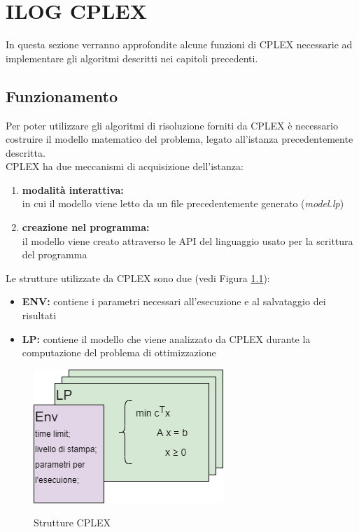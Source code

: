 \chapter{ILOG CPLEX}
In questa sezione verranno approfondite alcune funzioni di CPLEX necessarie ad implementare gli algoritmi descritti nei capitoli precedenti.

\section{Funzionamento}
Per poter utilizzare gli algoritmi di risoluzione forniti da CPLEX è necessario costruire il modello matematico del problema, legato all'istanza precedentemente descritta.\\
CPLEX ha due meccanismi di acquisizione dell'istanza:
\begin{enumerate}
\item{\textbf{modalità interattiva:}\\
in cui il modello viene letto da un file precedentemente generato (\textit{model.lp})}
\item{\textbf{creazione nel programma:}\\
il modello viene creato attraverso le API del linguaggio usato per la scrittura del programma}
\end{enumerate}

Le strutture utilizzate da CPLEX sono due (vedi Figura \ref{strutture_cplex}):
\begin{itemize}
\item{\textbf{ENV:} contiene i parametri necessari all'esecuzione e al salvataggio dei risultati}
\item{\textbf{LP:} contiene il modello che viene analizzato da CPLEX durante la computazione del problema di ottimizzazione}
\end{itemize}

\begin{figure}[h] 
\begin{center} 
  \includegraphics[scale=0.7]{Images/cplex_structs}\\ 
  \caption{\footnotesize{Strutture CPLEX}}
  \label{strutture_cplex} 
\end{center} 
\end{figure}

